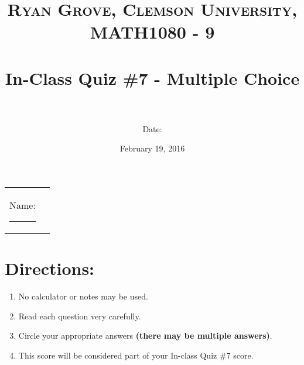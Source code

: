 \documentclass[paper=a4, fontsize=11pt]{scrartcl} %
\title{	
\normalfont \normalsize 
\textsc{Ryan Grove, Clemson University, MATH1080 - 9} \\ [25pt] %
\horrule{0.5pt} \\[0.4cm] %
\huge In-Class Quiz \#7 - Multiple Choice \\ %
\horrule{2pt} \\[0.5cm] %
}
\author{Date:} %
\date{\normalsize February 19, 2016} %
\numberwithin{equation}{section} %
\numberwithin{figure}{section} %
\numberwithin{table}{section} %
\begin{document}
\maketitle %

\begin{flushleft}
\begin{tabular}{l l}
Name: \rule{3.2in}{.01cm}  & {}%
\end{tabular}
\end{flushleft}


\section*{\textbf{Directions:}}
\begin{enumerate}
\item No calculator or notes may be used.
\item Read each question very carefully.
\item Circle your appropriate answers \textbf{(there may be multiple answers)}.
\item This score will be considered part of your In-class Quiz \#7 score.
\end{enumerate}
    \vspace{0.5in}
\newpage
\end{document}
